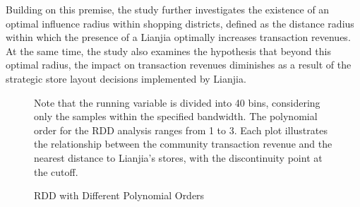 \documentclass[11pt]{article}
\begin{document}
Building on this premise, the study further investigates the existence of an optimal influence radius within shopping districts, defined as the distance radius within which the presence of a Lianjia optimally increases transaction revenues. At the same time, the study also examines the hypothesis that beyond this optimal radius, the impact on transaction revenues diminishes as a result of the strategic store layout decisions implemented by Lianjia.

\begin{figure}[ht]
    \centering
    \hfill %
    \hfill %
    \caption{RDD with Different Polynomial Orders}
    \label{fig:RD_design}

    Note that the running variable is divided into 40 bins, considering only the samples within the specified bandwidth. The polynomial order for the RDD analysis ranges from 1 to 3. Each plot illustrates the relationship between the community transaction revenue and the nearest distance to Lianjia's stores, with the discontinuity point at the cutoff.
\end{figure}
\end{document}

